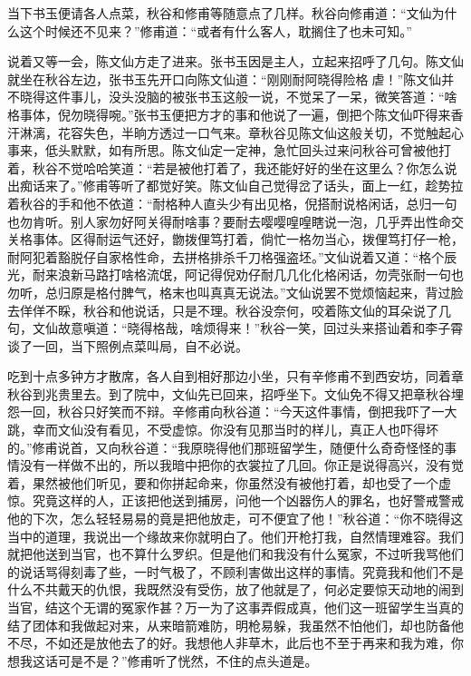 \documentclass[12pt,UTF8]{ctexbook}
\begin{document}
{{{当下书玉便请各人点菜，秋谷和修甫等随意点了几样。秋谷向修甫道：“文仙为什么这个时候还不见来？”修甫道：“或者有什么客人，耽搁住了也未可知。”

说着又等一会，陈文仙方走了进来。张书玉因是主人，立起来招呼了几句。陈文仙就坐在秋谷左边，张书玉先开口向陈文仙道：“刚刚耐阿晓得险格虐！”陈文仙并不晓得这件事儿，没头没脑的被张书玉这般一说，不觉呆了一呆，微笑答道：“啥格事体，倪勿晓得啘。”张书玉便把方才的事和他说了一遍，倒把个陈文仙吓得来香汗淋漓，花容失色，半晌方透过一口气来。章秋谷见陈文仙这般关切，不觉触起心事来，低头默默，如有所思。陈文仙定一定神，急忙回头过来问秋谷可曾被他打着，秋谷不觉哈哈笑道：“若是被他打着了，我还能好好的坐在这里么？你怎么说出痴话来了。”修甫等听了都觉好笑。陈文仙自己觉得岔了话头，面上一红，趁势拉着秋谷的手和他不依道：“耐格种人直头少有出见格，倪搭耐说格闲话，总归一句也勿肯听。别人家勿好阿关得耐啥事？要耐去嘤嘤喤喤瞎说一泡，几乎弄出性命交关格事体。区得耐运气还好，朆拨俚笃打着，倘忙一格勿当心，拨俚笃打仔一枪，耐阿犯着豁脱仔自家格性命，去拼格排杀千刀格强盗坯。”文仙说着又道：“格个辰光，耐来浪新马路打啥格流氓，阿记得倪劝仔耐几几化化格闲话，勿壳张耐一句也勿听，总归原是格付脾气，格末也叫真真无说法。”文仙说罢不觉烦恼起来，背过脸去佯佯不睬，秋谷和他说话，只是不理。秋谷没奈何，咬着陈文仙的耳朵说了几句，文仙故意嗔道：“晓得格哉，啥烦得来！”秋谷一笑，回过头来搭讪着和李子霄谈了一回，当下照例点菜叫局，自不必说。

吃到十点多钟方才散席，各人自到相好那边小坐，只有辛修甫不到西安坊，同着章秋谷到兆贵里去。到了院中，文仙先已回来，招呼坐下。文仙免不得又把章秋谷埋怨一回，秋谷只好笑而不辩。辛修甫向秋谷道：“今天这件事情，倒把我吓了一大跳，幸而文仙没有看见，不受虚惊。你没有见那当时的样儿，真正人也吓得坏的。”修甫说首，又向秋谷道：“我原晓得他们那班留学生，随便什么奇奇怪怪的事情没有一样做不出的，所以我暗中把你的衣裳拉了几回。你正是说得高兴，没有觉着，果然被他们听见，要和你拼起命来，你虽然没有被他打着，却也受了一个虚惊。究竟这样的人，正该把他送到捕房，问他一个凶器伤人的罪名，也好警戒警戒他的下次，怎么轻轻易易的竟是把他放走，可不便宜了他！”秋谷道：“你不晓得这当中的道理，我说出一个缘故来你就明白了。他们开枪打我，自然情理难容。我们就把他送到当官，也不算什么罗织。但是他们和我没有什么冤家，不过听我骂他们的说话骂得刻毒了些，一时气极了，不顾利害做出这样的事情。究竟我和他们不是什么不共戴天的仇恨，我既然没有受伤，放了他就是了，何必定要惊天动地的闹到当官，结这个无谓的冤家作甚？万一为了这事弄假成真，他们这一班留学生当真的结了团体和我做起对来，从来暗箭难防，明枪易躲，我虽然不怕他们，却也防备他不尽，不如还是放他去了的好。我想他人非草木，此后也不至于再来和我为难，你想我这话可是不是？”修甫听了恍然，不住的点头道是。

}}}
\end{document}

